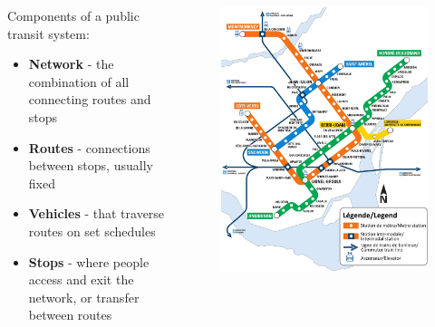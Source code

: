 \documentclass[aspectratio=169]{beamer}
\begin{document}
\begin{frame}
	
	
	
	\begin{columns}
		\begin{column}{0.5\textwidth}
			
			Components of a public transit system:
			
			\begin{itemize}
				\item \textbf{Network} - the combination of all connecting routes and stops
				
				\item \textbf{Routes} - connections between stops, usually fixed
				
				\item \textbf{Vehicles} - that traverse routes on set schedules
				
				\item \textbf{Stops} - where people access and exit the network, or transfer between routes
				
			\end{itemize}
			
			
		\end{column}
		
		\begin{column}{0.5\textwidth}
			\begin{figure}
				\centering
				\includegraphics[width=1\linewidth]{images/montreal-metro-map.jpg}
			\end{figure}
			

\end{column}
\end{columns}
\end{frame}
\end{document}
